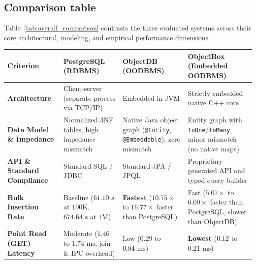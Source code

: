\documentclass{article}
\begin{document}
\subsection{Comparison table}

Table~\ref{tab:overall_comparison} contrasts the three evaluated systems across their core architectural, modeling, and empirical performance dimensions.

\begin{table}[H]
    \centering
    \small
    \begin{tabularx}{\textwidth}{>{\RaggedRight\bfseries}p{3.1cm} L L L}
        \toprule
        \textbf{Criterion}                      & \textbf{PostgreSQL (RDBMS)}                                                    & \textbf{ObjectDB (OODBMS)}                                                       & \textbf{ObjectBox (Embedded OODBMS)}                                              \\
        \midrule
        \textbf{Architecture}                   & Client-server (separate process via TCP/IP)                                    & Embedded in-JVM                                                                  & Strictly embedded native C++ core                                                 \\
        \addlinespace[4pt]
        \textbf{Data Model \& Impedance}        & Normalized 3NF tables, high impedance mismatch                                 & Native Java object graph (\texttt{@Entity}, \texttt{@Embeddable}), zero mismatch & Entity graph with \texttt{ToOne}/\texttt{ToMany}, minor mismatch (no native maps) \\
        \addlinespace[4pt]
        \textbf{API \& Standard Compliance}     & Standard SQL / JDBC                                                            & Standard JPA / JPQL                                                              & Proprietary generated API and typed query builder                                 \\
        \addlinespace[4pt]
        \textbf{Bulk Insertion Rate}            & Baseline ($61.10\text{ s}$ at $100\text{K}$, $674.64\text{ s}$ at $1\text{M}$) & \textbf{Fastest} ($10.75\times$ to $16.77\times$ faster than PostgreSQL)         & Fast ($5.07\times$ to $6.00\times$ faster than PostgreSQL, slower than ObjectDB)  \\
        \addlinespace[4pt]
        \textbf{Point Read (GET) Latency}       & Moderate ($1.46$ to $1.74\text{ ms}$, join \& IPC overhead)                    & Low ($0.29$ to $0.84\text{ ms}$)                                                 & \textbf{Lowest} ($0.12$ to $0.21\text{ ms}$)                                      \\

\end{tabularx}
\end{table}
\end{document}
